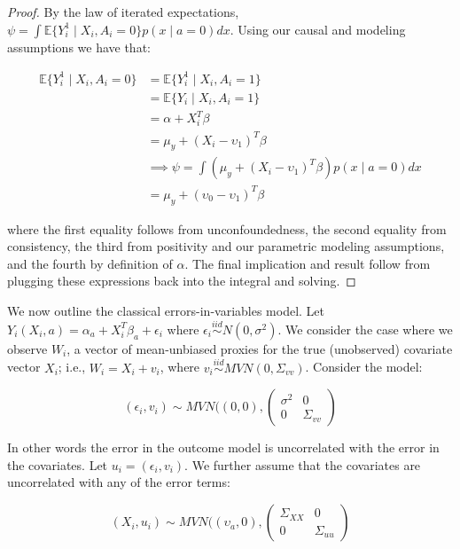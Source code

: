 \begin{proof}
By the law of iterated expectations, $\psi = \int \mathbb{E}\{Y_i^1 \mid X_i, A_i = 0\}p(x \mid a = 0)dx$. Using our causal and modeling assumptions we have that:

\begin{align*}
\mathbb{E}\{Y_i^1 \mid X_i, A_i = 0\} &= \mathbb{E}\{Y_i^1 \mid X_i, A_i = 1\} \\ 
&= \mathbb{E}\{Y_i \mid X_i, A_i = 1\} \\
&= \alpha + X_i^T\beta \\
&= \mu_y + (X_i - \upsilon_1)^T\beta \\
&\implies \psi = \int (\mu_y + (X_i - \upsilon_1)^T\beta) p(x \mid a = 0)dx \\
&= \mu_y + (\upsilon_0 - \upsilon_1)^T\beta
\end{align*}

where the first equality follows from unconfoundedness, the second equality from consistency, the third from positivity and our parametric modeling assumptions, and the fourth by definition of $\alpha$. The final implication and result follow from plugging these expressions back into the integral and solving.

\end{proof}

We now outline the classical errors-in-variables model. Let $Y_i(X_i, a) = \alpha_a + X_i^T\beta_a + \epsilon_i$ where $\epsilon_i \stackrel{iid}\sim N(0, \sigma^2)$. We consider the case where we observe $W_i$, a vector of mean-unbiased proxies for the true (unobserved) covariate vector $X_i$; i.e., $W_i = X_i + v_i$, where $v_i \stackrel{iid}\sim MVN(0, \Sigma_{vv})$. Consider the model:

\begin{equation}
(\epsilon_i, v_i) \sim MVN((0, 0), \begin{pmatrix} 
\sigma^2 & 0 \\ 
0 & \Sigma_{vv}  
\end{pmatrix}
\end{equation}

In other words the error in the outcome model is uncorrelated with the error in the covariates. Let $u_i = (\epsilon_i, v_i)$. We further assume that the covariates are uncorrelated with any of the error terms:

\begin{equation}
(X_i, u_i) \sim MVN((\upsilon_a, 0), \begin{pmatrix} 
\Sigma_{XX} & 0 \\ 
0 & \Sigma_{uu}  
\end{pmatrix}
\end{equation}

